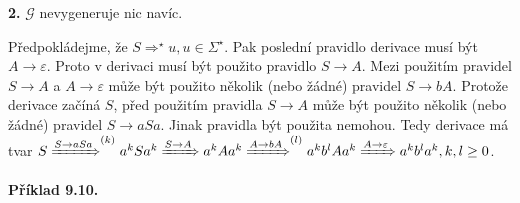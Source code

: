 \documentclass[11pt]{article}
\begin{document}
\textbf{2.} $\mathcal{G}$ nevygeneruje nic navíc.

Předpokládejme, že $S \Rightarrow^\star u, u \in \Sigma^\star$. Pak poslední pravidlo derivace musí být $A \rightarrow \varepsilon$. Proto v derivaci musí být použito pravidlo $S \rightarrow A$. Mezi použitím pravidel $S \rightarrow A$ a $A \rightarrow \varepsilon$ může být použito několik (nebo žádné) pravidel $S \rightarrow bA$. Protože derivace začíná $S$, před použitím pravidla $S \rightarrow A$ může být použito několik (nebo žádné) pravidel $S \rightarrow aSa$. Jinak pravidla být použita nemohou. Tedy derivace má tvar $S \xRightarrow{S \rightarrow a S a}^{(k)} a^k S a^k \xRightarrow{S \rightarrow A} a^k A a^k \xRightarrow{A \rightarrow bA}^{(l)} a^k b^l A a^k \xRightarrow{A \rightarrow \varepsilon} a^k b^l a^k , k,l \geq 0$.


\newpage
\noindent
\textbf{Příklad 9.10.} 

\noindent
{}
\\
\\
\\
\end{document}
